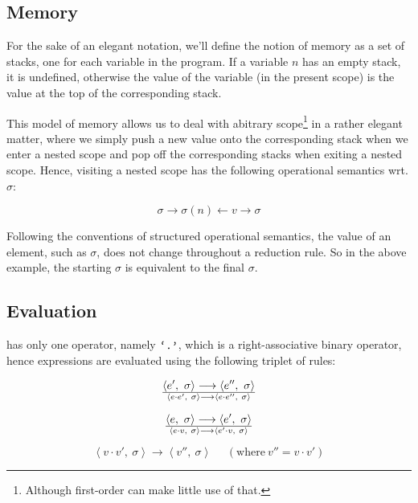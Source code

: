 \subsection{Memory}\label{section:language-semantics-memory}

For the sake of an elegant notation, we'll define the notion of memory as a set
of stacks, one for each variable in the program. If a variable $n$ has an empty
stack, it is undefined, otherwise the value of the variable (in the present
scope) is the value at the top of the corresponding stack.

This model of memory allows us to deal with abitrary scope\footnote{Although
first-order  can make little use of that.} in a rather elegant matter,
where we simply push a new value onto the corresponding stack when we enter a
nested scope and pop off the corresponding stacks when exiting a nested scope.
Hence, visiting a nested scope has the following operational semantics wrt.
$\sigma$:

$$\sigma\longrightarrow\sigma(n)\leftarrow v\longrightarrow\sigma$$

Following the conventions of structured operational semantics, the value of an
element, such as $\sigma$, does not change throughout a reduction rule. So in
the above example, the starting $\sigma$ is equivalent to the final $\sigma$.

\subsection{Evaluation}

 has only one operator, namely $\text{{\ttfamily`.'}}$, which is a right-associative
binary operator, hence expressions are evaluated using the following triplet of
rules:

\begin{equation}
{
\left\langle e',\ \sigma\right\rangle
\longrightarrow
\left\langle e'',\ \sigma\right\rangle
}\over {
\left\langle e \cdot e',\ \sigma\right\rangle
\longrightarrow
\left\langle e \cdot e'',\ \sigma\right\rangle
}
\end{equation}

\begin{equation}
{
\left\langle e,\ \sigma\right\rangle
\longrightarrow
\left\langle e',\ \sigma\right\rangle
}\over {
\left\langle e\cdot v,\ \sigma\right\rangle
\longrightarrow
\left\langle e' \cdot v,\ \sigma\right\rangle
}
\end{equation}

\begin{equation}
\left\langle v \cdot v',\ \sigma\right\rangle
\longrightarrow
\left\langle v'',\ \sigma\right\rangle
\ \ \ \ \ \ (\text{where}\ v'' = v \cdot v')
\end{equation}

